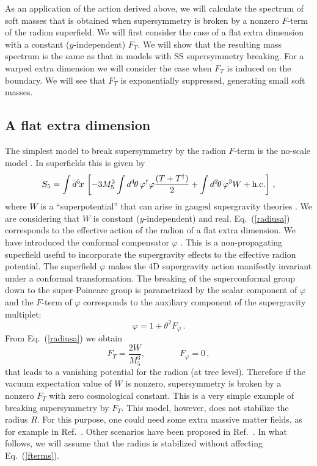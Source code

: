 \documentclass[a4paper,12pt]{article}
\begin{document}
As an application of the action derived above, we will calculate the 
spectrum of soft masses that is obtained when supersymmetry is broken
by a nonzero  $F$-term  of the radion superfield.
We will first consider the case of a flat extra dimension
with a constant ($y$-independent)
  $F_T$.
We will show that the resulting mass 
spectrum is the same as that in models with  SS supersymmetry breaking.
For a 
warped extra dimension we will consider the case when
 $F_T$ is induced on the boundary. 
We will see that 
$F_T$ is
 exponentially suppressed,
generating  small soft masses.



\subsection{A flat extra dimension}

The simplest model to break supersymmetry 
by the radion $F$-term is the no-scale model \cite{noscale}.
In 
superfields this is given by
\begin{equation}
S_5=\int d^{5}\! x\, \left[-3
M^3_5\int d^4\mspace{-2mu}\theta\,
 \varphi^\dagger\varphi\frac{(T+T^\dagger)}{2}+
\int d^2\mspace{-2mu}\theta\, \varphi^3 W+\text{h.c.}\right]\, ,
\label{radiusa}
\end{equation}
where $W$ is a  ``superpotential'' 
that can arise in gauged supergravity
theories \cite{W}. 
We are considering that  $W$ is constant ($y$-independent) and real.
Eq.~(\ref{radiusa}) corresponds to the effective action of the radion
of  a flat extra dimension.
We
have introduced  
the conformal compensator $\varphi$ \cite{compensator}. 
This is a non-propagating superfield
useful to incorporate the supergravity effects to the effective 
radion potential. 
The superfield  $\varphi$ makes the 4D supergravity action manifestly 
invariant under a conformal transformation.
The breaking of  the superconformal group down to the 
super-Poincare group is parametrized by the scalar component of $\varphi$
and the  $F$-term of $\varphi$ corresponds to
the auxiliary component of the supergravity multiplet:
\begin{equation}
\varphi=1+\theta^2 F_\varphi\, .
\end{equation}
{}From Eq.~(\ref{radiusa}) we obtain
\begin{equation}
F_T=\frac{2W}{M^3_5},\qquad\qquad  F_\varphi=0\, ,
\label{fterms}
\end{equation}
that leads to a vanishing potential for the radion (at tree level).
Therefore if the vacuum expectation value 
of $W$ is nonzero, supersymmetry is broken 
by a nonzero $F_T$ with zero cosmological constant.
This is  a very simple example of breaking supersymmetry
by $F_T$. 
This model, however, does not stabilize  the radius $R$. 
For this purpose,
one could need some extra massive matter fields, 
as for example in Ref.~\cite{pop}.
Other scenarios have been proposed in 
Ref.~\cite{ls}.
In what follows, we will assume 
that the radius is stabilized without affecting Eq.~(\ref{fterms}).
\end{document}
